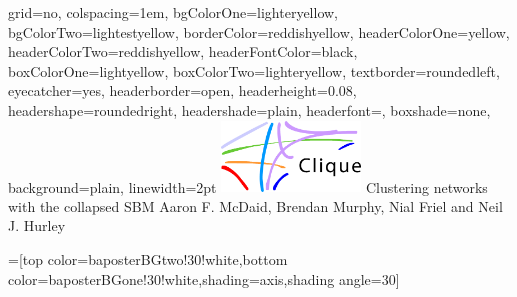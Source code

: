 \documentclass[portrait,final,a0paper]{baposter}
\begin{document}
\newlength{\leftimgwidth}
\begin{poster}%
  {
  grid=no,
  colspacing=1em,
  bgColorOne=lighteryellow,
  bgColorTwo=lightestyellow,
  borderColor=reddishyellow,
  headerColorOne=yellow,
  headerColorTwo=reddishyellow,
  headerFontColor=black,
  boxColorOne=lightyellow,
  boxColorTwo=lighteryellow,
  textborder=roundedleft,
  eyecatcher=yes,
  headerborder=open,
  headerheight=0.08\textheight,
  headershape=roundedright,
  headershade=plain,
  headerfont=\Large\textsf, %
  boxshade=none,
  background=plain,
  linewidth=2pt
  }
  {\includegraphics[width=10em]{clique}} %
  {\sf %
  Clustering networks with the collapsed SBM}
  {\sf %
  Aaron F. McDaid, Brendan Murphy, Nial Friel and Neil J. Hurley
  }
  {%
  }

  =[top color=baposterBGtwo!30!white,bottom color=baposterBGone!30!white,shading=axis,shading angle=30]

     \setlength{\leftimgwidth}{0.78em+8.0em}


\end{poster}
\end{document}
